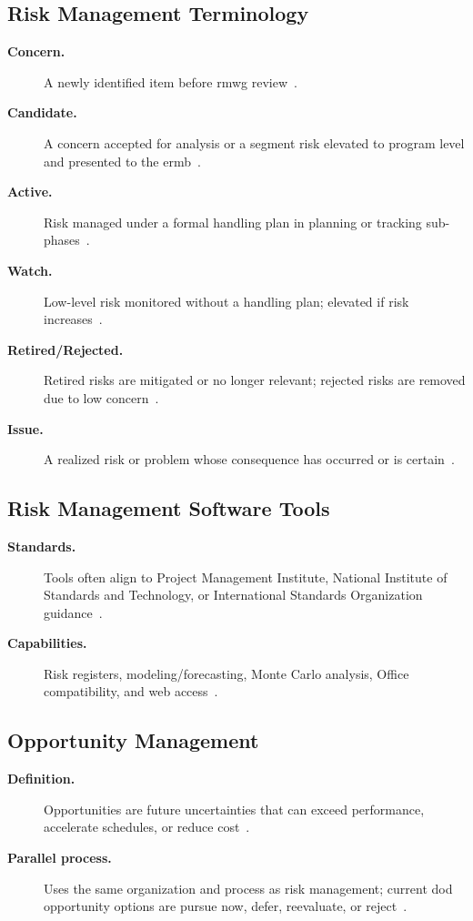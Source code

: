 \documentclass[../main.tex]{subfiles}
\begin{document}
\subsection{Risk Management Terminology}
\begin{description}
  \item[\textbf{Concern.}] A newly identified item before \ac{rmwg} review~\autocite{edo-3-3-6-risk-management-problem-solving-2025}.
  \item[\textbf{Candidate.}] A concern accepted for analysis or a segment risk elevated to program level and presented to the \ac{ermb}~\autocite{edo-3-3-6-risk-management-problem-solving-2025}.
  \item[\textbf{Active.}] Risk managed under a formal handling plan in planning or tracking sub-phases~\autocite{edo-3-3-6-risk-management-problem-solving-2025}.
  \item[\textbf{Watch.}] Low-level risk monitored without a handling plan; elevated if risk increases~\autocite{edo-3-3-6-risk-management-problem-solving-2025}.
  \item[\textbf{Retired/Rejected.}] Retired risks are mitigated or no longer relevant; rejected risks are removed due to low concern~\autocite{edo-3-3-6-risk-management-problem-solving-2025}.
  \item[\textbf{Issue.}] A realized risk or problem whose consequence has occurred or is certain~\autocite{edo-3-3-6-risk-management-problem-solving-2025}.
\end{description}

\subsection{Risk Management Software Tools}
\begin{description}
  \item[\textbf{Standards.}] Tools often align to Project Management Institute, National Institute of Standards and Technology, or International Standards Organization guidance~\autocite{edo-3-3-6-risk-management-problem-solving-2025}.
  \item[\textbf{Capabilities.}] Risk registers, modeling/forecasting, Monte Carlo analysis, Office compatibility, and web access~\autocite{edo-3-3-6-risk-management-problem-solving-2025}.
\end{description}

\subsection{Opportunity Management}
\begin{description}
  \item[\textbf{Definition.}] Opportunities are future uncertainties that can exceed performance, accelerate schedules, or reduce cost~\autocite{edo-3-3-6-risk-management-problem-solving-2025}.
  \item[\textbf{Parallel process.}] Uses the same organization and process as risk management; current \ac{dod} opportunity options are pursue now, defer, reevaluate, or reject~\autocite{edo-3-3-6-risk-management-problem-solving-2025,DoD-RIO-Guide-2017}.
\end{description}
\end{document}
